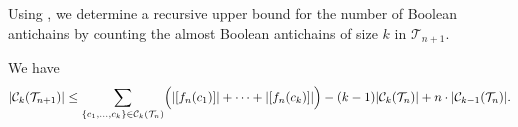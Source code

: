 \documentclass{preprint}
\newcommand{\cC}{\mathcal{C}}
\newcommand{\cT}{\mathcal{T}}
\theoremstyle{definition}
\begin{document}

Using , we determine a recursive upper bound for the number of Boolean antichains by counting the almost Boolean antichains of size $k$ in $\cT_{n+1}$.

\begin{corollary}\label{lem: UpperBoundsNumberBooleanAntichains}
We have
\begin{equation*}
    |\cC_k(\cT_{n+1})| \leq \sum_{\{c_1,\dots,c_k\}\in \cC_k(\cT_n)} \Bigl( |[f_n(c_1)]| + \dots + |[f_n(c_k)]|\Bigr) - (k-1) |\cC_k(\cT_n)| + n \cdot |\cC_{k-1}(\cT_n)|.
\end{equation*}

\end{corollary}
\end{document}
